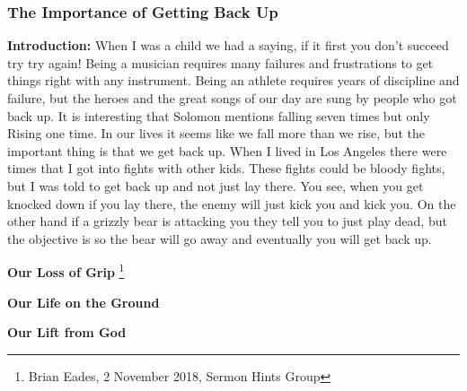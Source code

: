 \subsubsection{The Importance of Getting Back Up}
\textbf{Introduction:} When I was a child we had a saying, if it first you don't succeed try try again!  Being a musician requires many failures and frustrations to get things right with any instrument. Being an athlete requires years of discipline and failure, but the heroes and the great songs of our day are sung by people who got back up.
It is interesting that Solomon mentions falling seven times but only Rising one time. In our lives it seems like we fall more than we rise, but the important thing is that we get back up. When I lived in Los Angeles there were times that I got into fights with other kids. These fights could be bloody fights, but I was told to get back up and not just lay there. You see, when you get knocked down if you lay there, the enemy will just kick you and kick you. On the other hand if a grizzly bear is attacking you they tell you to just play dead, but the objective is so the bear will go away and eventually you will get back up.\\
\begin{compactenum}[I.][5]
    \item \textbf{Our Loss of Grip} \footnote{Brian Eades, 2 November 2018, Sermon Hints Group}
    \item \textbf{Our Life on the Ground} 
    \item \textbf{Our Lift from God} \end{compactenum}